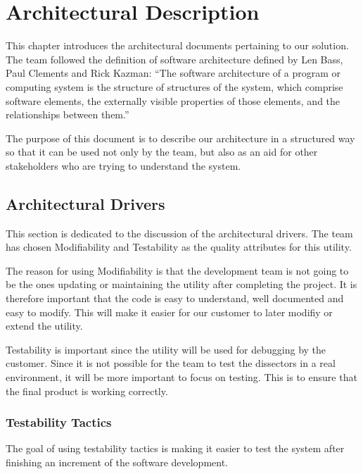 \chapter{Architectural Description}
This chapter introduces the architectural documents pertaining to our solution. The team followed the definition of software architecture defined by Len Bass, Paul Clements and Rick Kazman: ``The software architecture of a program or computing
system is the structure of structures of the system, which comprise software elements, the externally visible properties of those elements, and the relationships between them.''\cite[p.3]{Bass2003}

The purpose of this document is to describe our architecture in a structured way so that it can be used not only by the team, but also as an aid for other stakeholders who are trying to understand the system.

\section{Architectural Drivers}
This section is dedicated to the discussion of the architectural drivers.
The team has chosen Modifiability and Testability as the quality attributes for this \gls{utility}. 

The reason for using Modifiability is that the development team is not going to be the ones updating or maintaining the \gls{utility} after completing the project. It is therefore important that the code is easy to understand, well documented and easy to modify. This will make it easier for our customer to later modifiy or extend the \gls{utility}.

Testability is important since the \gls{utility} will be used for debugging by the customer.  Since it is not possible for the team to test the \glspl{dissector} in a real environment, it will be more important to focus on testing. This is to ensure that the final product is working correctly.

\subsection{Testability Tactics}
The goal of using testability tactics is making it easier to test the system after finishing an increment of the software development. 

